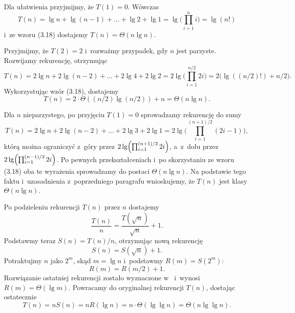 \subproblem %
Dla ułatwienia przyjmijmy, że $T(1)=0$.
Wówczas
\[
	T(n) = \lg n+\lg(n-1)+\dots+\lg2+\lg1 = \lg\biggl(\prod_{i=1}^ni\biggr) = \lg(n!)
\]
i~ze wzoru (3.18) dostajemy $T(n)=\Theta(n\lg n)$.

\subproblem %
Przyjmijmy, że $T(2)=2$ i~rozważmy przypadek, gdy $n$ jest parzyste.
Rozwijamy rekurencję, otrzymując
\[
	T(n) = 2\lg n+2\lg(n-2)+\dots+2\lg4+2\lg2 = 2\lg\biggl(\prod_{i=1}^{n/2}2i\biggr) = 2\bigl(\lg((n/2)!)+n/2\bigr).
\]
Wykorzystując wzór (3.18), dostajemy
\[
	T(n) = 2\cdot\Theta((n/2)\lg (n/2))+n = \Theta(n\lg n).
\]

Dla $n$ nieparzystego, po przyjęciu $T(1)=0$ sprowadzamy rekurencję do sumy
\[
	T(n) = 2\lg n+2\lg(n-2)+\dots+2\lg3+2\lg1 = 2\lg\biggl(\prod_{i=1}^{(n+1)/2}(2i-1)\biggr),
\]
którą można ograniczyć z~góry przez $2\lg\Bigl(\prod_{i=1}^{(n+1)/2}2i\Bigr)$, a~z~dołu przez $2\lg\Bigl(\prod_{i=1}^{(n-1)/2}2i\Bigr)$.
Po pewnych przekształceniach i~po skorzystaniu ze wzoru (3.18) oba te wyrażenia sprowadzamy do postaci $\Theta(n\lg n)$.
Na podstawie tego faktu i~uzasadnienia z~poprzedniego paragrafu wnioskujemy, że $T(n)$ jest klasy $\Theta(n\lg n)$.

\subproblem %
Po podzieleniu rekurencji $T(n)$ przez $n$ dostajemy
\[
	\frac{T(n)}{n} = \frac{T(\!\sqrt{n})}{\sqrt{n}}+1.
\]
Podstawmy teraz $S(n)=T(n)/n$, otrzymując nową rekurencję
\[
	S(n) = S(\!\sqrt{n})+1.
\]
Potraktujmy $n$ jako $2^m$, skąd $m=\lg n$ i~podstawmy $R(m)=S(2^m)$:
\[
	R(m) = R(m/2)+1.
\]
Rozwiązanie ostatniej rekurencji zostało wyznaczone w~ i~wynosi $R(m)=\Theta(\lg m)$.
Powracamy do oryginalnej rekurencji $T(n)$, dostając ostatecznie
\[
	T(n) = nS(n) = nR(\lg n) = n\cdot\Theta(\lg\lg n) = \Theta(n\lg\lg n).
\]
